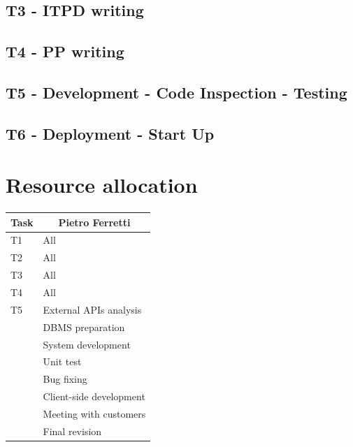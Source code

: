 \documentclass[english]{article}
\begin{document}

\subsection{T3 - ITPD writing}


\subsection{T4 - PP writing}


\subsection{T5 - Development - Code Inspection -  Testing}


\subsection{T6 - Deployment - Start Up}



\section{Resource allocation}

\paragraph{}

\begin{center}
	\begin{tabular}{|p{2cm}|p{4cm}|}
		\hline
		\multicolumn{1}{|c|}{\textbf{Task}} & \multicolumn{1}{c|}{\textbf{Pietro Ferretti}}\\
		\hline
		T1 & All\\
		\hline
		T2 & All\\
		\hline
		T3 & All\\
		\hline
		T4 & All\\
		\hline
		T5 & External APIs analysis\\
		\hline
		& DBMS preparation\\
		\hline
		& System development\\
		\hline
		& Unit test\\
		\hline
		& Bug fixing\\
		\hline
		& Client-side development\\
		\hline
		& Meeting with customers\\
		\hline
		& Final revision\\
		\hline
		
	\end{tabular}
\end{center}
\end{document}
